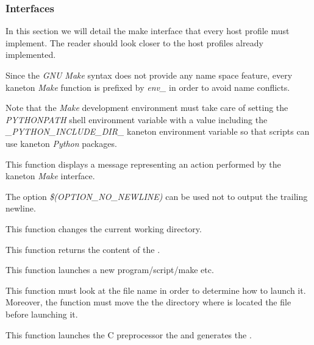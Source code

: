 \subsubsection{Interfaces}



In this section we will detail the make interface that every host profile
must implement. The reader should look closer to the host profiles already
implemented.

Since the \textit{GNU Make} syntax does not provide any name space feature,
every kaneton \textit{Make} function is prefixed by \textit{env\_} in order
to avoid name conflicts.

Note that the \textit{Make} development environment must take care of
setting the \textit{PYTHONPATH} shell environment variable with a value
including the \textit{\_PYTHON\_INCLUDE\_DIR\_} kaneton environment variable
so that scripts can use kaneton \textit{Python} packages.

         {
	   This function displays a message representing an action performed
	   by the kaneton \textit{Make} interface.

	   \-

	   The option \textit{\$(OPTION\_NO\_NEWLINE)} can be used not to
	   output the trailing newline.
	 }

         {
	   This function changes the current working directory.
	 }

         {
	   This function returns the content of the .
	 }

         {
	   This function launches a new program/script/make etc.

	   \-

	   This function must look at the file name in order to determine
	   how to launch it. Moreover, the function must move the the
	   directory where is located the file before launching it.
	 }

         {
	   This function launches the C preprocessor the 
	   and generates the .
	 }

